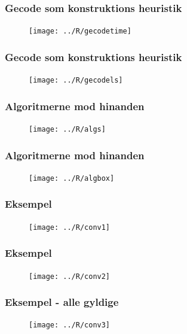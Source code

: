 \documentclass[smaller,handouts]{beamer}
\begin{document}
\begin{frame}
\frametitle{Gecode som konstruktions heuristik}
\begin{figure}[!h]
\centering
\texttt{[image: ../R/gecodetime]}
\end{figure}\noindent
\end{frame}

\begin{frame}
\frametitle{Gecode som konstruktions heuristik}
\begin{figure}[!h]
\centering
\texttt{[image: ../R/gecodels]}
\end{figure}\noindent
\end{frame}



\begin{frame}
\frametitle{Algoritmerne mod hinanden}
\begin{figure}[!h]
\centerline{
\texttt{[image: ../R/algs]}}
\end{figure}\noindent
\end{frame}


\begin{frame}
\frametitle{Algoritmerne mod hinanden}
\begin{figure}[!h]
\centerline{
\texttt{[image: ../R/algbox]}}
\end{figure}\noindent
\end{frame}

\begin{frame}
\frametitle{Eksempel}
\begin{figure}[!h]
\centerline{
\texttt{[image: ../R/conv1]}}
\end{figure}\noindent
\end{frame}

\begin{frame}
\frametitle{Eksempel}
\begin{figure}[!h]
\centerline{
\texttt{[image: ../R/conv2]}}
\end{figure}\noindent
\end{frame}
\begin{frame}


\frametitle{Eksempel - alle gyldige}
\begin{figure}[!h]
\centerline{
\texttt{[image: ../R/conv3]}}
\end{figure}\noindent
\end{frame}
\end{document}
